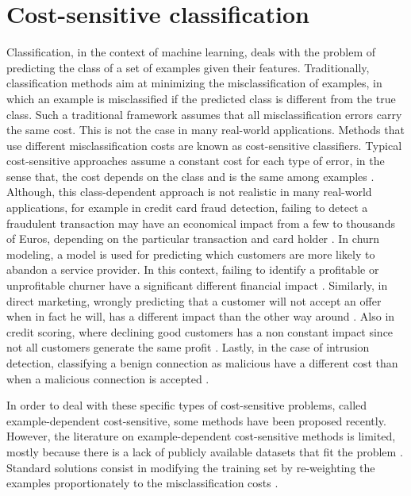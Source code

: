 \section{Cost-sensitive classification}
  Classification, in the context of machine learning, deals with the problem of predicting the class
  of a set of examples given their features. Traditionally, classification methods aim at 
  minimizing the misclassification of examples, in which an example is misclassified if the 
  predicted class is different from the true class. Such a traditional framework assumes that all 
  misclassification errors carry the same cost. This is not the case in many real-world 
  applications. Methods that use different misclassification costs are known as cost-sensitive 
  classifiers. Typical cost-sensitive approaches assume a constant cost for each type of error, in 
  the sense that, the cost depends on the class and is the same among examples 
  \citep{Elkan2001,Kim2012}. 
  Although, this class-dependent approach is not realistic in many real-world applications, for 
  example in credit card fraud detection, failing to detect a fraudulent transaction may have an 
  economical impact from a few to thousands of Euros, depending on the particular transaction and 
  card holder \citep{Sahin2013}. In churn modeling, a model is used for predicting which
  customers are more likely to abandon a service provider. In this context, failing to identify a 
  profitable or unprofitable churner have a significant different financial impact 
  \citep{Glady2009}. Similarly, in direct marketing, wrongly predicting that a customer will not 
  accept an offer when in fact he will, has a different impact than the other way around 
  \citep{Zadrozny2003}. Also in credit scoring, where declining good customers has a non constant 
  impact since not all  customers generate the same profit \citep{Verbraken2014}. Lastly, in the 
  case of intrusion   detection, classifying a benign connection as malicious have a different cost 
  than when a   malicious connection is accepted \citep{Ma2011}.

  In order to deal with these specific types of cost-sensitive problems, called example-dependent
  cost-sensitive, some methods have been proposed recently. However, the literature on 
  example-dependent cost-sensitive methods is limited, mostly because there is a lack of publicly 
  available datasets that fit the problem \citep{MacAodha2013}. Standard solutions consist in 
  modifying the training set by re-weighting the examples proportionately to the misclassification 
  costs \citep{Elkan2001,Zadrozny2003}.

